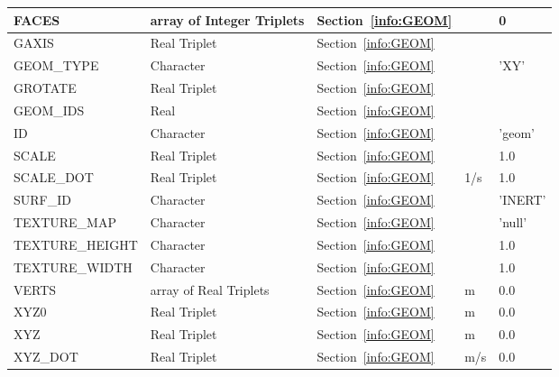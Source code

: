 \documentclass[12pt]{article}
\begin{document}
\begin{longtable}{@{\extracolsep{\fill}}|l|l|l|l|l|}
{\ct FACES}        & array of Integer Triplets     & Section~\ref{info:GEOM}     &           &    0                     \\ \hline
{\ct GAXIS}        & Real Triplet           & Section~\ref{info:GEOM}            &           &                          \\ \hline
{\ct GEOM\_TYPE}   & Character              & Section~\ref{info:GEOM}            &           & {\ct 'XY'}               \\ \hline
{\ct GROTATE}      & Real Triplet           & Section~\ref{info:GEOM}            &           &                          \\ \hline
{\ct GEOM\_IDS}    & Real                   & Section~\ref{info:GEOM}            &           &                          \\ \hline
{\ct ID}           & Character              & Section~\ref{info:GEOM}            &           &   {\ct 'geom'}           \\ \hline
{\ct SCALE}        & Real Triplet           & Section~\ref{info:GEOM}            &           &   1.0                    \\ \hline
{\ct SCALE\_DOT}   & Real Triplet           & Section~\ref{info:GEOM}            &  1/s      &   1.0                    \\ \hline
{\ct SURF\_ID}     & Character              & Section~\ref{info:GEOM}            &           &  {\ct 'INERT'}           \\ \hline
{\ct TEXTURE\_MAP} & Character              & Section~\ref{info:GEOM}            &           &  {\ct 'null'}            \\ \hline
{\ct TEXTURE\_HEIGHT} & Character              & Section~\ref{info:GEOM}            &           & 1.0                   \\ \hline
{\ct TEXTURE\_WIDTH} & Character              & Section~\ref{info:GEOM}            &           & 1.0                    \\ \hline
{\ct VERTS}        & array of Real Triplets & Section~\ref{info:GEOM}            &   m       &   0.0                    \\ \hline
{\ct XYZ0}         & Real Triplet           & Section~\ref{info:GEOM}            &   m       &   0.0                    \\ \hline
{\ct XYZ}          & Real Triplet           & Section~\ref{info:GEOM}            &   m       &   0.0                    \\ \hline
{\ct XYZ\_DOT}     & Real Triplet           & Section~\ref{info:GEOM}            &   m/s     &   0.0                    \\ \hline

\end{longtable}
\end{document}
